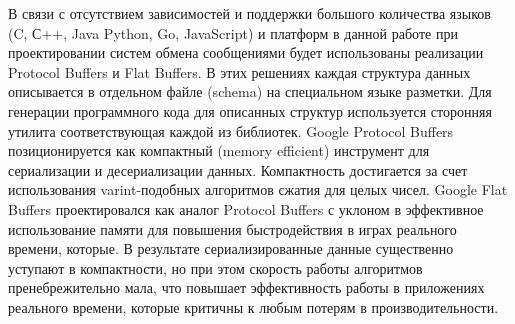 В связи с отсутствием зависимостей и поддержки большого 
количества языков (C, С++, Java Python, Go, JavaScript) и 
платформ  в данной работе при проектировании систем обмена 
сообщениями будет использованы реализации Protocol Buffers и 
Flat Buffers. В этих решениях каждая структура данных 
описывается в отдельном файле (schema) на специальном языке 
разметки. Для генерации программного кода для описанных структур 
используется сторонняя утилита соответствующая каждой из 
библиотек. Google Protocol Buffers позиционируется как 
компактный (memory efficient) инструмент для сериализации и 
десериализации данных. Компактность достигается за счет 
использования varint-подобных алгоритмов сжатия для целых чисел. 
Google Flat Buffers проектировался как аналог Protocol Buffers с 
уклоном в эффективное использование памяти для повышения 
быстродействия в играх реального времени, которые. В результате 
сериализированные данные существенно уступают в компактности, но 
при этом скорость работы алгоритмов пренебрежительно мала, что 
повышает эффективность работы в приложениях реального времени, 
которые критичны к любым потерям в производительности.
